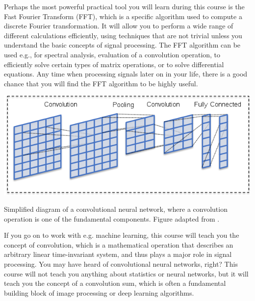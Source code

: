 Perhaps the most powerful practical tool you will learn during this course
is the Fast Fourier Transform (FFT), which is a specific algorithm used to compute a
discrete Fourier transformation. It will allow you to perform a wide range of different
calculations efficiently, using techniques that are not trivial unless you understand the
basic concepts of signal processing. The FFT algorithm can be used e.g., for spectral analysis,
evaluation of a convolution operation, to efficiently solve certain types of matrix operations,
or to solve differential equations. Any time when processing signals
later on in your life, there is a good chance that you will find the FFT algorithm to be highly useful.

\begin{marginfigure}[1cm]
	\begin{center}
		\includegraphics[width=\textwidth]{ch01/figures/cnn.png}
	\end{center}
	\caption{Simplified diagram of a convolutional neural network, where a convolution operation is one of the fundamental components. Figure adapted from \citep{maier2019gentle}.}
	\label{fig:cnn}
\end{marginfigure}

If you go on to work with e.g. machine learning, this course will teach you the concept of convolution,
which is a mathematical operation that describes an arbitrary linear time-invariant system, and thus plays
a major role in signal processing. You may have heard of convolutional neural networks, right?
This course will not teach you anything about statistics or neural networks, but it will teach you
the concept of a convolution sum, which is often a fundamental
building block of image processing or deep learning algorithms\cite{maier2019gentle}.


